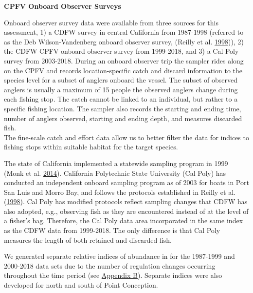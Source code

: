 \documentclass[12pt,]{article}
\begin{document}
\textbf{CPFV Onboard Observer Surveys}

Onboard observer survey data were available from three sources for this
assessment, 1) a CDFW survey in central California from 1987-1998
(referred to as the Deb Wilson-Vandenberg onboard observer survey,
(Reilly et al. \protect\hyperlink{ref-Reilly1998}{1998})), 2) the CDFW
CPFV onboard observer survey from 1999-2018, and 3) a Cal Poly survey
from 2003-2018. During an onboard observer trip the sampler rides along
on the CPFV and records location-specific catch and discard information
to the species level for a subset of anglers onboard the vessel. The
subset of observed anglers is usually a maximum of 15 people the
observed anglers change during each fishing stop. The catch cannot be
linked to an individual, but rather to a specific fishing location. The
sampler also records the starting and ending time, number of anglers
observed, starting and ending depth, and measures discarded fish.\\
The fine-scale catch and effort data allow us to better filter the data
for indices to fishing stops within suitable habitat for the target
species.

The state of California implemented a statewide sampling program in 1999
(Monk et al. \protect\hyperlink{ref-Monk2014}{2014}). California
Polytechnic State University (Cal Poly) has conducted an independent
onboard sampling program as of 2003 for boats in Port San Luis and Morro
Bay, and follows the protocols established in Reilly et al.
(\protect\hyperlink{ref-Reilly1998}{1998}). Cal Poly has modified
protocols reflect sampling changes that CDFW has also adopted, e.g.,
observing fish as they are encountered instead of at the level of a
fisher's bag. Therefore, the Cal Poly data area incorporated in the same
index as the CDFW data from 1999-2018. The only difference is that Cal
Poly measures the length of both retained and discarded fish.

We generated separate relative indices of abundance in for the 1987-1999
and 2000-2018 data sets due to the number of regulation changes
occurring throughout the time period (see
\protect\hyperlink{appendix-b.-californias-recreational-fishery-regulations}{Appendix
B}). Separate indices were also developed for north and south of Point
Conception.
\end{document}
